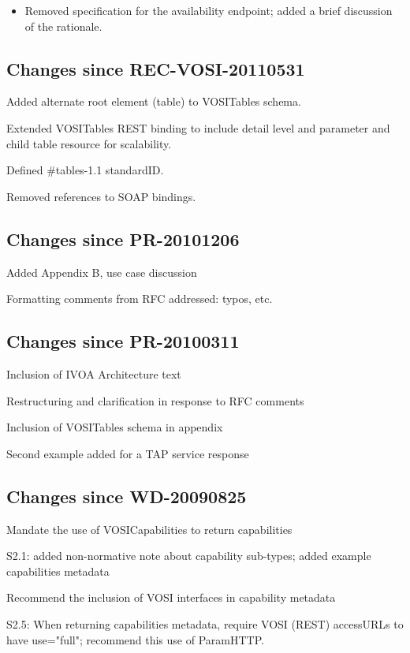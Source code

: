 \documentclass[11pt,letter]{ivoa}
\begin{document}
\begin{itemize}
\item Removed specification for the availability endpoint; added a brief
discussion of the rationale.
\end{itemize}

\subsection{Changes since REC-VOSI-20110531}

Added alternate root element (table) to VOSITables schema.

Extended VOSITables REST binding to include detail level and parameter
and child table resource for scalability.

Defined \#tables-1.1 standardID.

Removed references to SOAP bindings.

\subsection{Changes since PR-20101206}

Added Appendix B, use case discussion
    
Formatting comments from RFC addressed: typos, etc.

\subsection{Changes since PR-20100311}

Inclusion of IVOA Architecture text

Restructuring and clarification in response to RFC comments

Inclusion of VOSITables schema in appendix

Second example added for a TAP service response

\subsection{Changes since WD-20090825}

Mandate the use of VOSICapabilities to return capabilities

S2.1: added non-normative note about capability sub-types; added example
capabilities metadata

Recommend the inclusion of VOSI interfaces in capability metadata

S2.5: When returning capabilities metadata, require VOSI (REST)
accessURLs to have use="full"; recommend this use of ParamHTTP.
\end{document}
